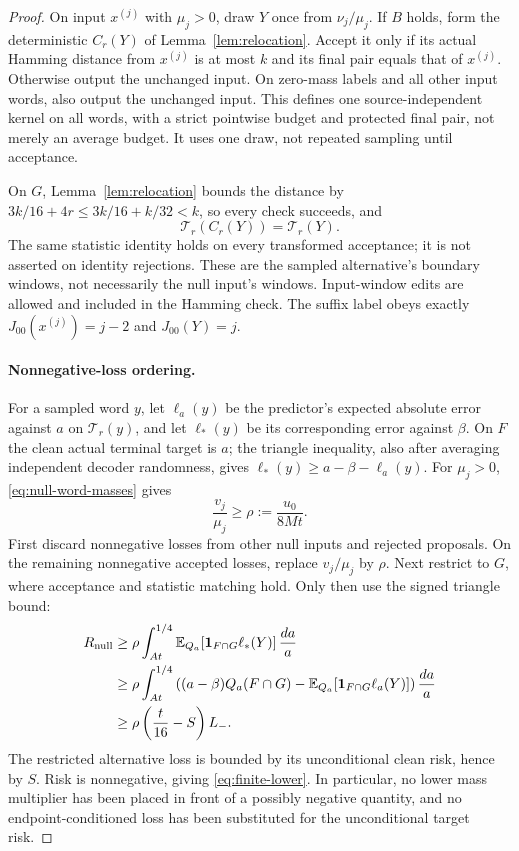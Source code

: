 \begin{proof}
On input $x^{(j)}$ with $\mu_j>0$, draw $Y$ once from
$\nu_j/\mu_j$. If $B$ holds, form the deterministic $C_r(Y)$ of
Lemma~\ref{lem:relocation}. Accept it only if its actual Hamming
distance from $x^{(j)}$ is at most $k$ and its final pair equals that
of $x^{(j)}$. Otherwise output the unchanged input. On zero-mass labels
and all other input words, also output the unchanged input. This defines
one source-independent kernel on all words, with a strict pointwise
budget and protected final pair, not merely an average budget.
It uses one draw, not repeated sampling until acceptance.

On $G$, Lemma~\ref{lem:relocation} bounds the distance by
$3k/16+4r\le3k/16+k/32<k$, so every check succeeds, and
\[
 \mathcal T_r(C_r(Y))=\mathcal T_r(Y).
\]
The same statistic identity holds on every transformed acceptance;
it is not asserted on identity rejections. These are the sampled
alternative's boundary windows, not necessarily the null input's
windows. Input-window edits are allowed and included in the Hamming
check. The suffix label obeys exactly
$J_{00}(x^{(j)})=j-2$ and $J_{00}(Y)=j$.

\paragraph{Nonnegative-loss ordering.}
For a sampled word $y$, let $\ell_a(y)$ be the predictor's expected
absolute error against $a$ on $\mathcal T_r(y)$, and let $\ell_*(y)$
be its corresponding error against $\beta$. On $F$ the clean actual
terminal target is $a$; the triangle inequality, also after averaging
independent decoder randomness, gives
$\ell_*(y)\ge a-\beta-\ell_a(y)$.
For $\mu_j>0$, \eqref{eq:null-word-masses} gives
\[
 \frac{v_j}{\mu_j}\ge\rho:=\frac{u_0}{8Mt}.
\]
First discard nonnegative losses from other null inputs and rejected
proposals. On the remaining nonnegative accepted losses, replace
$v_j/\mu_j$ by $\rho$. Next restrict to $G$, where acceptance and
statistic matching hold. Only then use the signed triangle bound:
\begin{align*}
 R_{\rm null}
 &\ge\rho\int_{At}^{1/4}
          \mathbb E_{Q_a}[\mathbf 1_{F\cap G}\ell_*(Y)]\,\frac{da}{a}\\
 &\ge\rho\int_{At}^{1/4}
    \left((a-\beta)Q_a(F\cap G)
          -\mathbb E_{Q_a}[\mathbf 1_{F\cap G}\ell_a(Y)]\right)\frac{da}{a}\\
 &\ge\rho\left(\frac t{16}-S\right)L_-.
\end{align*}
The restricted alternative loss is bounded by its unconditional clean
risk, hence by $S$. Risk is nonnegative, giving \eqref{eq:finite-lower}.
In particular, no lower mass multiplier has been placed in front of a
possibly negative quantity, and no endpoint-conditioned loss has been
substituted for the unconditional target risk.
\end{proof}

